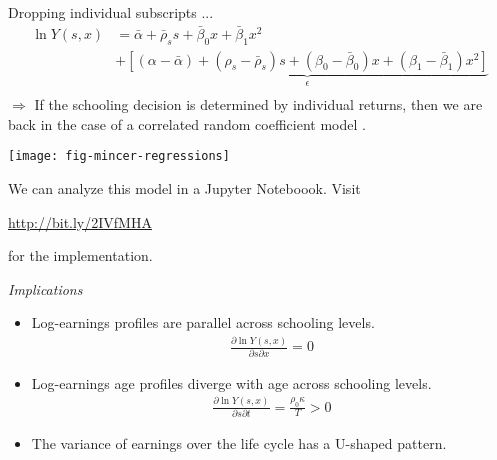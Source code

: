 \begin{frame}
Dropping individual subscripts ...
\begin{align*}
\ln{Y(s, x)} & = \bar{\alpha} + \bar{\rho}_s s + \bar{\beta}_{0} x + \bar{\beta}_{1} x^2 \\
                & + \underbrace{[(\alpha - \bar{\alpha}) + (\rho_s - \bar{\rho}_s) s + (\beta_0 - \bar{\beta}_0)x + (\beta_1 - \bar{\beta}_1)x^2 ]}_{\epsilon}\\
\end{align*}
$\Rightarrow$ If the schooling decision is determined by individual returns, then we are back in the case of a correlated random coefficient model \cite{Heckman.2006d}.
\end{frame}
\begin{frame}[plain]

\begin{center}
\texttt{[image: fig-mincer-regressions]}
\end{center}

\end{frame}
\begin{frame}
We can analyze this model in a Jupyter Noteboook. Visit
\begin{center}
\url{http://bit.ly/2IVfMHA}
\end{center}
for the implementation.
\end{frame}
\begin{frame}\begin{center}
\LARGE\textit{Implications}
\end{center}\end{frame}
\begin{frame}
\begin{itemize}
\item Log-earnings profiles are parallel across schooling levels.
\begin{align*}
\frac{\partial \ln{Y(s, x)}}{\partial s \partial x} = 0
\end{align*}
\item Log-earnings age profiles diverge with age across schooling levels.
\begin{align*}
\frac{\partial \ln{Y(s, x)}}{\partial s \partial t} = \frac{\rho_0\kappa}{T} > 0
\end{align*}
\item The variance of earnings over the life cycle has a U-shaped pattern.
\end{itemize}
\end{frame}
